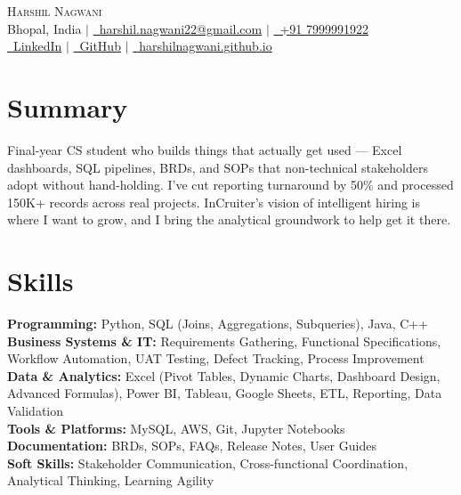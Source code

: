 \documentclass[letterpaper,11pt]{article}
\begin{document}
\begin{center}
    {\Huge \scshape Harshil Nagwani} \\ \vspace{4pt}
    \small
    Bhopal, India \quad $|$ \quad
    \href{mailto:harshil.nagwani22@gmail.com}{\faEnvelope\ harshil.nagwani22@gmail.com} \quad $|$ \quad
    \href{tel:+917999991922}{\faPhone\ +91 7999991922} \\ \vspace{3pt}
    \href{https://www.linkedin.com/in/harshil-nagwani/}{\faLinkedin\ LinkedIn} \quad $|$ \quad
    \href{https://github.com/harshilnagwani}{\faGithub\ GitHub} \quad $|$ \quad
    \href{https://harshilnagwani.github.io}{\faGlobe\ harshilnagwani.github.io}
\end{center}

\section{Summary}
Final-year CS student who builds things that actually get used --- Excel dashboards, SQL pipelines, BRDs, and SOPs that non-technical stakeholders adopt without hand-holding. I've cut reporting turnaround by 50\% and processed 150K+ records across real projects. InCruiter's vision of intelligent hiring is where I want to grow, and I bring the analytical groundwork to help get it there.

\section{Skills}
\begin{itemize}[leftmargin=0.15in, label={}]
    \small{\item{
     \textbf{Programming:}{ Python, SQL (Joins, Aggregations, Subqueries), Java, C++} \\
     \textbf{Business Systems \& IT:}{ Requirements Gathering, Functional Specifications, Workflow Automation, UAT Testing, Defect Tracking, Process Improvement} \\
     \textbf{Data \& Analytics:}{ Excel (Pivot Tables, Dynamic Charts, Dashboard Design, Advanced Formulas), Power BI, Tableau, Google Sheets, ETL, Reporting, Data Validation} \\
     \textbf{Tools \& Platforms:}{ MySQL, AWS, Git, Jupyter Notebooks} \\
     \textbf{Documentation:}{ BRDs, SOPs, FAQs, Release Notes, User Guides} \\
     \textbf{Soft Skills:}{ Stakeholder Communication, Cross-functional Coordination, Analytical Thinking, Learning Agility}
    }}
\end{itemize}
\end{document}
